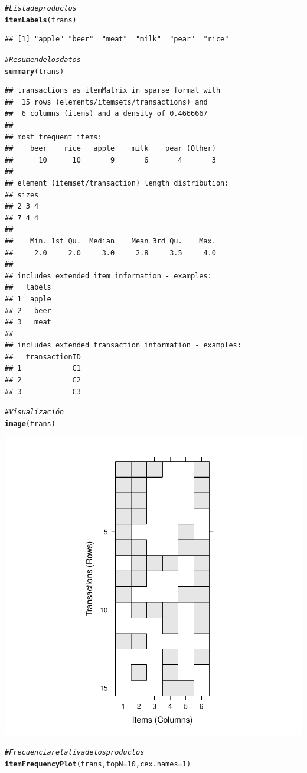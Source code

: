 \documentclass{article}\usepackage[]{graphicx}\usepackage[]{xcolor}
\makeatletter
\newcommand{\hlnum}[1]{\textcolor[rgb]{0.686,0.059,0.569}{#1}}%
\newcommand{\hlcom}[1]{\textcolor[rgb]{0.678,0.584,0.686}{\textit{#1}}}%
\newcommand{\hlstd}[1]{\textcolor[rgb]{0.345,0.345,0.345}{#1}}%
\newcommand{\hlkwc}[1]{\textcolor[rgb]{0.333,0.667,0.333}{#1}}%
\newcommand{\hlkwd}[1]{\textcolor[rgb]{0.737,0.353,0.396}{\textbf{#1}}}%
\newenvironment{kframe}{%
 \def\at@end@of@kframe{}%
 \ifinner\ifhmode%
  \def\at@end@of@kframe{\end{minipage}}%
  \begin{minipage}{\columnwidth}%
 \fi\fi%
 \def\FrameCommand##1{\hskip\@totalleftmargin \hskip-\fboxsep
 \colorbox{shadecolor}{##1}\hskip-\fboxsep
     \hskip-\linewidth \hskip-\@totalleftmargin \hskip\columnwidth}%
 \MakeFramed {\advance\hsize-\width
   \@totalleftmargin\z@ \linewidth\hsize
   \@setminipage}}%
 {\par\unskip\endMakeFramed%
 \at@end@of@kframe}
\newenvironment{knitrout}{}{} %
\makeatother
\begin{document}
\begin{knitrout}
\begin{kframe}
\begin{alltt}
\hlcom{# Lista de productos}
\hlkwd{itemLabels}\hlstd{(trans)}
\end{alltt}
\begin{verbatim}
## [1] "apple" "beer"  "meat"  "milk"  "pear"  "rice"
\end{verbatim}
\begin{alltt}
\hlcom{# Resumen de los datos}
\hlkwd{summary}\hlstd{(trans)}
\end{alltt}
\begin{verbatim}
## transactions as itemMatrix in sparse format with
##  15 rows (elements/itemsets/transactions) and
##  6 columns (items) and a density of 0.4666667 
## 
## most frequent items:
##    beer    rice   apple    milk    pear (Other) 
##      10      10       9       6       4       3 
## 
## element (itemset/transaction) length distribution:
## sizes
## 2 3 4 
## 7 4 4 
## 
##    Min. 1st Qu.  Median    Mean 3rd Qu.    Max. 
##     2.0     2.0     3.0     2.8     3.5     4.0 
## 
## includes extended item information - examples:
##   labels
## 1  apple
## 2   beer
## 3   meat
## 
## includes extended transaction information - examples:
##   transactionID
## 1            C1
## 2            C2
## 3            C3
\end{verbatim}
\begin{alltt}
\hlcom{# Visualización}
\hlkwd{image}\hlstd{(trans)}
\end{alltt}
\end{kframe}

{\centering \includegraphics[width=.6\linewidth]{figure/ARULES1-SOLUCION-Rnwauto-report-1} 

}


\begin{kframe}\begin{alltt}
\hlcom{# Frecuencia relativa de los productos}
\hlkwd{itemFrequencyPlot}\hlstd{(trans,} \hlkwc{topN}\hlstd{=}\hlnum{10}\hlstd{,}  \hlkwc{cex.names}\hlstd{=}\hlnum{1}\hlstd{)}
\end{alltt}
\end{kframe}


\end{knitrout}
\end{document}
